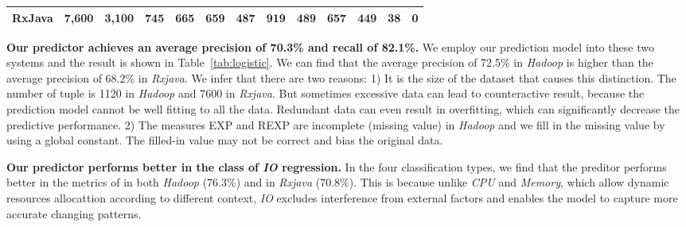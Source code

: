 \begin{table*}[tbh]
\begin{tabular}{|c|r|r|c|r|c|r|c|r|c|r|c|r|}
		RxJava            & 7,600                                                                           & 3,100                                                                  & \multicolumn{1}{r|}{745}                                & 665                                                                           & \multicolumn{1}{r|}{659}                                & 487                                                                           & \multicolumn{1}{r|}{919}                                & 489                                                                           & \multicolumn{1}{r|}{657}                                & 449                                                                           & \multicolumn{1}{r|}{38}                                 & 0                                                                             \\ \hline
	\end{tabular}
\end{table*}

 \textbf{Our predictor achieves an average precision of 70.3\% and recall of 82.1\%.} We employ our prediction model into these two systems and the result is shown in Table~\ref{tab:logistic}. We can find that the average precision of 72.5\% in \emph{Hadoop} is higher than the average precision of 68.2\% in \emph{Rxjava}. We infer that there are two reasons: 1) It is the size of the dataset that causes this distinction. The number of tuple is 1120 in \emph{Hadoop} and 7600 in \emph{Rxjava}. But sometimes excessive data can lead to counteractive result, because the prediction model cannot be well fitting to all the data. Redundant data can even result in overfitting, which can significantly decrease the predictive performance.  2) The measures EXP and REXP  are incomplete (missing value) in \emph{Hadoop} and we fill in the missing value by using a global constant. The filled-in value may not be correct and bias the original data.
 
 \textbf{Our predictor performs better in the class of \emph{IO} regression.} In the four classification types, we find that the preditor performs better in the metrics of  in both \emph{Hadoop} (76.3\%) and in  \emph{Rxjava} (70.8\%). This is because unlike \emph{CPU} and \emph{Memory}, which allow dynamic resources allocattion according to different context, \emph{IO} excludes interference from external factors and enables the model to capture more accurate changing patterns.


